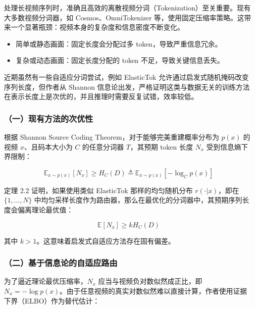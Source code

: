 处理长视频序列时，准确且高效的离散视频分词（Tokenization）至关重要。现有大多数视频分词器，如 Cosmos、OmniTokenizer 等，使用固定压缩率策略。这带来一个显著瓶颈：视频本身的复杂度和信息密度不断变化。

\begin{itemize}
\tightlist
\item
  简单或静态画面：固定长度会分配过多 token，导致严重信息冗余。
\item
  复杂或动态画面：固定长度分配的 token 不足，导致关键信息丢失。
\end{itemize}

近期虽然有一些自适应分词尝试，例如 ElasticTok 允许通过启发式随机掩码改变序列长度，但作者从 Shannon 信息论出发，严格证明这类与数据无关的训练方法在表示长度上是次优的，并且推理时需要反复试错，效率较低。

\hypertarget{ux4e00ux73b0ux6709ux65b9ux6cd5ux7684ux6b21ux4f18ux6027}{%
\subsubsection{（一）现有方法的次优性}\label{ux4e00ux73b0ux6709ux65b9ux6cd5ux7684ux6b21ux4f18ux6027}}

根据 Shannon Source Coding Theorem，对于能够完美重建概率分布为 \(p(x)\) 的视频 \(x\)、且码本大小为 \(C\) 的任意分词器 \(T\)，其预期 token 长度 \(N_x\) 受到信息熵下界限制：

\[
\mathbb{E}_{x\sim p(x)}[N_x]\ge H_C(D)
\triangleq
\mathbb{E}_{x\sim p(x)}[-\log_C p(x)]
\]

定理 2.2 证明，如果使用类似 ElasticTok 那样的均匀随机分布 \(r(\cdot|x)\)，即在 \(\{1,\ldots,N\}\) 中均匀采样长度作为路由器，那么在最优化的分词器中，其预期序列长度会偏离理论最优值：

\[
\mathbb{E}[N_x]\ge kH_C(D)
\]

其中 \(k\gt 1\)。这意味着启发式自适应方法存在固有偏差。

\hypertarget{ux4e8cux57faux4e8eux4fe1ux606fux8bbaux7684ux81eaux9002ux5e94ux8defux7531}{%
\subsubsection{（二）基于信息论的自适应路由}\label{ux4e8cux57faux4e8eux4fe1ux606fux8bbaux7684ux81eaux9002ux5e94ux8defux7531}}

为了逼近理论最优压缩率，\(N_x\) 应当与视频负对数似然成正比，即 \(N_x=-\log p(x)\)。由于任意视频的真实对数似然难以直接计算，作者使用证据下界（ELBO）作为替代估计：

